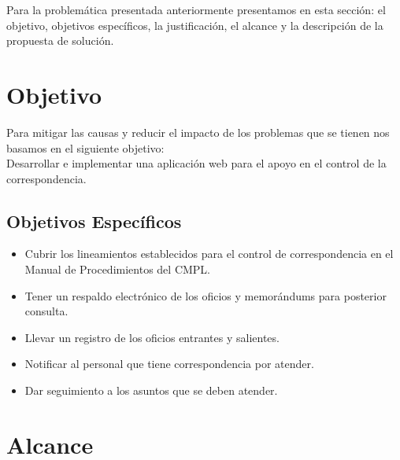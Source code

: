 
Para la problemática presentada anteriormente presentamos en esta sección: el objetivo, objetivos específicos, la justificación, el alcance y la descripción de la propuesta de solución.\\

\section{Objetivo}

Para mitigar las causas y reducir el impacto de los problemas que se tienen nos basamos en el siguiente objetivo: \\

Desarrollar e implementar una aplicación web para el apoyo en el control de la correspondencia.\\

\subsection{Objetivos Específicos}

\begin{itemize}
	\item Cubrir los lineamientos establecidos para el control de correspondencia en el Manual de Procedimientos del CMPL.
	\item Tener un respaldo electrónico de los oficios y memorándums para posterior consulta.
	\item Llevar un registro de los oficios entrantes y salientes.
	\item Notificar al personal que tiene correspondencia por atender.
	\item Dar seguimiento a los asuntos que se deben atender.
\end{itemize}


\section{Alcance}

